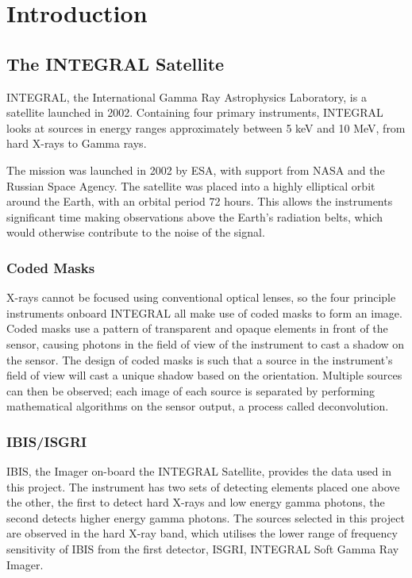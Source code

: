 
\chapter{Introduction} %

\label{ch:introduction} %


\section{The INTEGRAL Satellite}
INTEGRAL, the International Gamma Ray Astrophysics Laboratory, is a satellite launched in 2002. Containing four primary instruments, INTEGRAL looks at sources in energy ranges approximately between 5 keV and 10 MeV, from hard X-rays to Gamma rays.

The mission was launched in 2002 by ESA, with support from NASA and the Russian Space Agency. The satellite was placed into a highly elliptical orbit around the Earth, with an orbital period 72 hours. This allows the instruments significant time making observations above the Earth's radiation belts, which would otherwise contribute to the noise of the signal.

\subsection{Coded Masks}
X-rays cannot be focused using conventional optical lenses, so the four principle instruments onboard INTEGRAL all make use of coded masks to form an image. Coded masks use a pattern of transparent and opaque elements in front of the sensor, causing photons in the field of view of the instrument to cast a shadow on the sensor. The design of coded masks is such that a source in the instrument's field of view will cast a unique shadow based on the orientation. Multiple sources can then be observed; each image of each source is separated by performing mathematical algorithms on the sensor output, a process called deconvolution. 

\subsection{IBIS/ISGRI}
IBIS, the Imager on-board the INTEGRAL Satellite, provides the data used in this project. The instrument has two sets of detecting elements placed one above the other, the first to detect hard X-rays and low energy gamma photons, the second detects higher energy gamma photons. The sources selected in this project are observed in the hard X-ray band, which utilises the lower range of frequency sensitivity of IBIS from the first detector, ISGRI, INTEGRAL Soft Gamma Ray Imager.